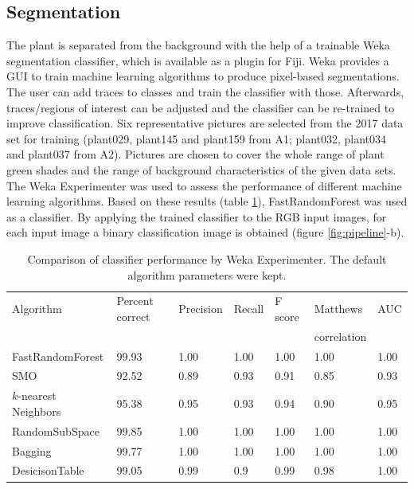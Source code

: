 \documentclass[paper=A4,bibliography=totocnumbered]{scrartcl}
\begin{document}
\subsection{Segmentation}
The plant is separated from the background with the help of a trainable Weka segmentation classifier, which is available as a plugin for Fiji. Weka provides a GUI to train machine learning algorithms to produce pixel-based segmentations. The user can add traces to classes and train the classifier with those. Afterwards, traces/regions of interest can be adjusted and the classifier can be re-trained to improve classification. Six representative pictures are selected from the 2017 data set for training (plant029, plant145 and plant159 from A1; plant032, plant034 and plant037 from A2). Pictures are chosen to cover the whole range of plant green shades and the range of background characteristics of the given data sets. The Weka Experimenter was used to assess the performance of different machine learning algorithms. Based on these results (table \ref{tab:weka}), FastRandomForest was used as a classifier. By applying the trained classifier to the RGB input images, for each input image a binary classification image is obtained (figure \ref{fig:pipeline}-b). 

\begin{table}[htbp]
	\centering
	\caption{Comparison of classifier performance by Weka Experimenter. The default algorithm parameters were kept.}
	\begin{tabular}{lllllll}
		\toprule
		Algorithm & Percent correct & Precision & Recall & F score & Matthews  & AUC \\
		 & & & & & correlation & \\
		 \midrule
		FastRandomForest & 99.93 & 1.00 & 1.00 & 1.00 & 1.00 & 1.00 \\
		SMO & 92.52 & 0.89 & 0.93 & 0.91 & 0.85 & 0.93 \\
		$k$-nearest Neighbors & 95.38 & 0.95 & 0.93 & 0.94 & 0.90 & 0.95 \\
		RandomSubSpace & 99.85 & 1.00 & 1.00 & 1.00 & 1.00 & 1.00 \\
		Bagging & 99.77 & 1.00 & 1.00 & 1.00 & 1.00 & 1.00 \\
		DesicisonTable & 99.05 & 0.99 & 0.9 & 0.99 & 0.98 & 1.00 \\
		\bottomrule
	\end{tabular}
	\label{tab:weka}
\end{table}
\end{document}
